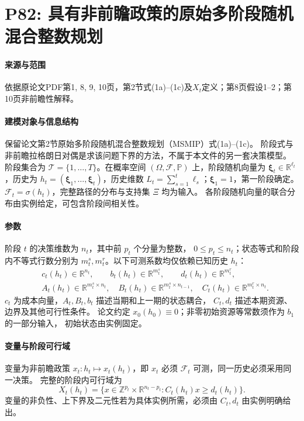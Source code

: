 \documentclass[UTF8,11pt]{ctexart}
\begin{document}
\section*{P82: 具有非前瞻政策的原始多阶段随机混合整数规划}
\paragraph{来源与范围}依据原论文PDF第1, 8, 9, 10页，第2节式(1a)--(1c)及$X_t$定义；第8页假设1--2；第10页非前瞻性解释。

\paragraph{建模对象与信息结构}
保留论文第2节原始多阶段随机混合整数规划（MSMIP）式(1a)--(1c)。
阶段式与非前瞻拉格朗日对偶是求该问题下界的方法，不属于本文件的另一套决策模型。
阶段集合为 $\mathcal T=\{1,\ldots,T\}$。在概率空间
$(\Omega,\mathcal F,\mathbb P)$ 上，阶段随机向量为
$\boldsymbol\xi_t\in\mathbb R^{\ell_t}$，历史为
$h_t=(\boldsymbol\xi_1,\ldots,\boldsymbol\xi_t)$，历史维数
$L_t=\sum_{s=1}^t\ell_s$；$\boldsymbol\xi_1=1$，第一阶段确定。
$\mathcal F_t=\sigma(h_t)$，完整路径的分布与支持集 $\Xi$ 均为输入。
各阶段随机向量的联合分布由实例给定，可包含阶段间相关性。

\paragraph{参数}
阶段 $t$ 的决策维数为 $n_t$，其中前 $p_t$ 个分量为整数，
$0\le p_t\le n_t$；状态等式和阶段内不等式行数分别为
$m_t^s,m_t^r$。以下可测系数均仅依赖已知历史 $h_t$：
\[
\begin{aligned}
&c_t(h_t)\in\mathbb R^{n_t},\qquad b_t(h_t)\in\mathbb R^{m_t^s},
\qquad d_t(h_t)\in\mathbb R^{m_t^r},\\
&A_t(h_t)\in\mathbb R^{m_t^s\times n_t},\quad
B_t(h_t)\in\mathbb R^{m_t^s\times n_{t-1}},\quad
C_t(h_t)\in\mathbb R^{m_t^r\times n_t}.
\end{aligned}
\]
$c_t$ 为成本向量，$A_t,B_t,b_t$ 描述当期和上一期的状态耦合，
$C_t,d_t$ 描述本期资源、边界及其他可行性条件。
论文约定 $x_0(h_0)\equiv0$；非零初始资源等常数须作为 $b_1$ 的一部分输入，
初始状态由实例固定。

\paragraph{变量与阶段可行域}
变量为非前瞻政策 $x_t: h_t\mapsto x_t(h_t)$，即 $x_t$ 必须
$\mathcal F_t$ 可测，同一历史必须采用同一决策。
完整的阶段内可行域为
\[
X_t(h_t)=\{x\in\mathbb Z^{p_t}\times\mathbb R^{n_t-p_t}:
 C_t(h_t)x\ge d_t(h_t)\}.
\]
变量的非负性、上下界及二元性若为具体实例所需，必须由 $C_t,d_t$
由实例明确给出。
\end{document}
